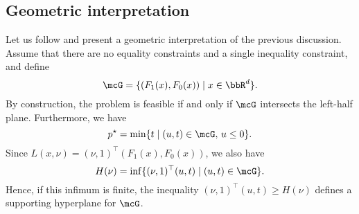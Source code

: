  
 
     \subsection{Geometric interpretation}
     \label{sec:geometric-interpretation}
 
     Let us follow \cite[Section~5.3]{boydConvex2023} and present a geometric interpretation of the previous discussion.
     Assume that there are no equality constraints and a single inequality constraint, and define
     \begin{equation}
         \mcG = \{ (F_1(x), F_0(x)) \mid x\in \bbR^d\}.
     \end{equation}
     By construction, the problem is feasible if and only if $\mcG$ intersects the left-half plane.
     Furthermore, we have
     \begin{equation}
         p^\star  = \min\{ t \mid (u,t)\in \mcG,\, u\le 0\}.
     \end{equation}
     Since $L(x,\nu) = (\nu,1)^\top (F_1(x),F_0(x))$, we also have
     \begin{equation}
         H(\nu) = \inf \{  (\nu,1)^\top (u,t) \mid (u,t)\in \mcG \}.
     \end{equation}
     Hence, if this infimum is finite, the inequality $(\nu,1)^\top (u,t)\ge H(\nu)$ defines a supporting hyperplane for $\mcG$.
 
